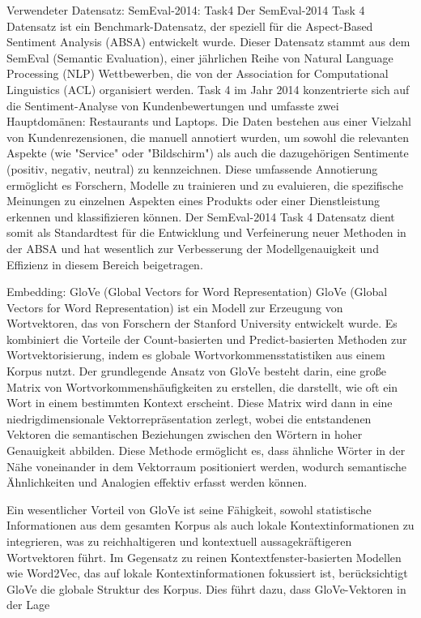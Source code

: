 \documentclass[12pt]{article}
\begin{document}
Verwendeter Datensatz: SemEval-2014: Task4
Der SemEval-2014 Task 4 Datensatz ist ein Benchmark-Datensatz, der speziell für die Aspect-Based Sentiment Analysis (ABSA) entwickelt wurde. Dieser Datensatz stammt aus dem SemEval (Semantic Evaluation), einer jährlichen Reihe von Natural Language Processing (NLP) Wettbewerben, die von der Association for Computational Linguistics (ACL) organisiert werden. Task 4 im Jahr 2014 konzentrierte sich auf die Sentiment-Analyse von Kundenbewertungen und umfasste zwei Hauptdomänen: Restaurants und Laptops. Die Daten bestehen aus einer Vielzahl von Kundenrezensionen, die manuell annotiert wurden, um sowohl die relevanten Aspekte (wie "Service" oder "Bildschirm") als auch die dazugehörigen Sentimente (positiv, negativ, neutral) zu kennzeichnen. Diese umfassende Annotierung ermöglicht es Forschern, Modelle zu trainieren und zu evaluieren, die spezifische Meinungen zu einzelnen Aspekten eines Produkts oder einer Dienstleistung erkennen und klassifizieren können. Der SemEval-2014 Task 4 Datensatz dient somit als Standardtest für die Entwicklung und Verfeinerung neuer Methoden in der ABSA und hat wesentlich zur Verbesserung der Modellgenauigkeit und Effizienz in diesem Bereich beigetragen.

Embedding: GloVe (Global Vectors for Word Representation)
GloVe (Global Vectors for Word Representation) ist ein Modell zur Erzeugung von Wortvektoren, das von Forschern der Stanford University entwickelt wurde. Es kombiniert die Vorteile der Count-basierten und Predict-basierten Methoden zur Wortvektorisierung, indem es globale Wortvorkommensstatistiken aus einem Korpus nutzt. Der grundlegende Ansatz von GloVe besteht darin, eine große Matrix von Wortvorkommenshäufigkeiten zu erstellen, die darstellt, wie oft ein Wort in einem bestimmten Kontext erscheint. Diese Matrix wird dann in eine niedrigdimensionale Vektorrepräsentation zerlegt, wobei die entstandenen Vektoren die semantischen Beziehungen zwischen den Wörtern in hoher Genauigkeit abbilden. Diese Methode ermöglicht es, dass ähnliche Wörter in der Nähe voneinander in dem Vektorraum positioniert werden, wodurch semantische Ähnlichkeiten und Analogien effektiv erfasst werden können.

Ein wesentlicher Vorteil von GloVe ist seine Fähigkeit, sowohl statistische Informationen aus dem gesamten Korpus als auch lokale Kontextinformationen 
zu integrieren, was zu reichhaltigeren und kontextuell aussagekräftigeren Wortvektoren führt. Im Gegensatz zu reinen Kontextfenster-basierten Modellen 
wie Word2Vec, das auf lokale Kontextinformationen fokussiert ist, berücksichtigt GloVe die globale Struktur des Korpus. Dies führt dazu, dass 
GloVe-Vektoren in der Lage
\end{document}
